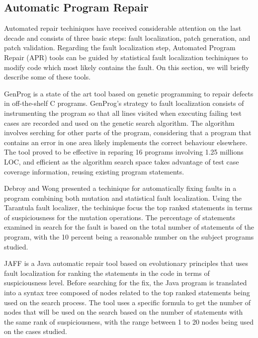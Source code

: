 \documentclass[sigplan,10pt,review,anonymous]{acmart}\settopmatter{printfolios=true,printccs=false,printacmref=false}
\begin{document}

\subsection{Automatic Program Repair}
Automated repair techiniques have received considerable attention on
the last decade and consists of three basic steps: fault localization, patch
generation, and patch validation.  Regarding the fault localization
step, Automated Program Repair (APR) tools can be guided by statistical
fault localization techiniques to modify code which most likely
contains the fault. On this section, we will briefly describe some of
these tools.

GenProg is a state of the art tool based on genetic
programming to repair defects in off-the-shelf C programs. GenProg's
strategy to fault localization consists of instrumenting the program
so that all lines visited when executing failing test cases are
recorded and used on the genetic search algorithm. The algorithm
involves serching for other parts of the program, considering that a
program that contains an error in one area likely implements the
correct behaviour elsewhere. The tool proved to be effective in
reparing 16 programs involving 1.25 millions LOC, and efficient as the
algorithm search space takes advantage of test case coverage
information, reusing  existing program statements.

Debroy and Wong presented a techinique for automatically
fixing faults in a program combining both mutation and statistical
fault localization. Using the Tarantula fault localizer, the
techinique focus the top ranked statements in terms of suspiciousness
for the mutation operations. The percentage of statements examined in
search for the fault is based on the total number of statements of the
program, with the 10 percent being a reasonable number on the subject
programs studied.

JAFF is a Java automatic repair tool based on evolutionary principles that uses fault localization for ranking the statements in the code in terms of suspiciousness level.
Before searching for the fix, the Java program is translated into a syntax tree composed of nodes related to the top ranked statements being used on the search process.
The tool uses a specific formula to get the number of nodes that will be used on the search based on the number of statements with the same rank of suspiciousness,
with the range between 1 to 20 nodes being used on the cases studied.
\end{document}
